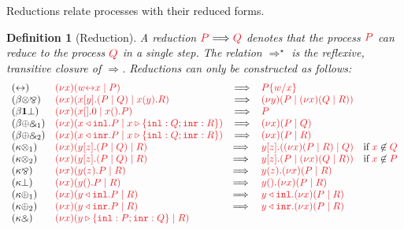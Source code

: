 \documentclass[draft,submission,copyright,creativecommons]{eptcs}
\newtheorem{definition}{Definition}
\begin{document}
Reductions relate processes with their reduced forms.
\begin{definition}[Reduction]\label{def:cp-reduction}
  A reduction $\reducesto{P}{Q}$ denotes that the process $\tm{P}$ can reduce
  to the process $\tm{Q}$ in a single step.
  The relation $\Longrightarrow^\star$ is the reflexive, transitive closure of
  $\Longrightarrow$.
  Reductions can only be constructed as follows:
  \[
    \begin{array}{llcll}
      \cpRedAxCut1
      & \tm{\cpCut{x}{\cpLink{w}{x}}{P}}
      & \Longrightarrow
      & \tm{\cpSub{w}{x}{P}}
      \\
      \cpRedBetaTensParr
      & \tm{\cpCut{x}{\cpSend{x}{y}{P}{Q}}{\cpRecv{x}{y}{R}}}
      & \Longrightarrow
      & \tm{\cpCut{y}{P}{\cpCut{x}{Q}{R}}}
      \\
      \cpRedBetaOneBot
      & \tm{\cpCut{x}{\cpHalt{x}}{\cpWait{x}{P}}}
      & \Longrightarrow
      & \tm{P}
      \\
      \cpRedBetaPlusWith1
      & \tm{\cpCut{x}{\cpInl{x}{P}}{\cpCase{x}{Q}{R}}}
      & \Longrightarrow
      & \tm{\cpCut{x}{P}{Q}}
      \\
      \cpRedBetaPlusWith2
      & \tm{\cpCut{x}{\cpInr{x}{P}}{\cpCase{x}{Q}{R}}}
      & \Longrightarrow
      & \tm{\cpCut{x}{P}{R}}
      \\
      \cpRedKappaTens1
      & \tm{\cpCut{x}{\cpSend{y}{z}{P}{Q}}{R}}
      & \Longrightarrow \;
      & \tm{\cpSend{y}{z}{\cpCut{x}{P}{R}}{Q}}
        \quad \text{if} \; \notFreeIn{x}{Q}
      \\
      \cpRedKappaTens2
      & \tm{\cpCut{x}{\cpSend{y}{z}{P}{Q}}{R}}
      & \Longrightarrow \;
      & \tm{\cpSend{y}{z}{P}{\cpCut{x}{Q}{R}}}
        \quad \text{if} \; \notFreeIn{x}{P}
      \\
      \cpRedKappaParr
      & \tm{\cpCut{x}{\cpRecv{y}{z}{P}}{R}}
      & \Longrightarrow \;
      & \tm{\cpRecv{y}{z}{\cpCut{x}{P}{R}}}
      \\
      \cpRedKappaBot
      & \tm{\cpCut{x}{\cpWait{y}{P}}{R}}
      & \Longrightarrow \;
      & \tm{\cpWait{y}{\cpCut{x}{P}{R}}}
      \\
      \cpRedKappaPlus1
      & \tm{\cpCut{x}{\cpInl{y}{P}}{R}}
      & \Longrightarrow \;
      & \tm{\cpInl{y}{\cpCut{x}{P}{R}}}
      \\
      \cpRedKappaPlus2
      &\tm{\cpCut{x}{\cpInr{y}{P}}{R}}
      & \Longrightarrow \;
      & \tm{\cpInr{y}{\cpCut{x}{P}{R}}}
      \\
      \cpRedKappaWith
      & \tm{\cpCut{x}{\cpCase{y}{P}{Q}}{R}}

\end{array}\]
\end{definition}
\end{document}
